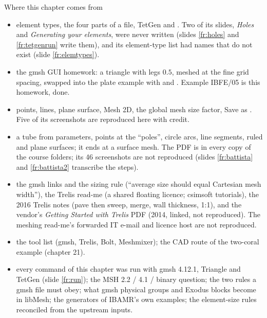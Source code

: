 \documentclass[aspectratio=169,11pt]{beamer}
\begin{document}
\begin{frame}{Where this chapter comes from}
\label{fr:sources}
\scriptsize
\begin{itemize}
  \item {} element types, the four parts of a  file, TetGen and . Two of its slides, \emph{Holes} and \emph{Generating your elements}, were never written (slides \ref{fr:holes} and \ref{fr:tetgenrun} write them), and its element-type list had names that do not exist (slide \ref{fr:elemtypes}).
  \item {} the gmsh GUI homework: a triangle with legs $0.5$, meshed at the fine grid spacing, swapped into the plate example with  and . Example IBFE/05 is this homework, done.
  \item {} points, lines, plane surface, Mesh 2D, the global mesh size factor, Save as . Five of its screenshots are reproduced here with credit.
  \item {} a tube from parameters, points at the ``poles'', circle arcs, line segments, ruled and plane surfaces; it ends at a surface mesh. The PDF is in every copy of the course folders; its 46 screenshots are not reproduced (slides \ref{fr:battista} and \ref{fr:battista2} transcribe the steps).
  \item {} the gmsh links and the sizing rule (``average size should equal Cartesian mesh width''), the Trelis read-me (a shared floating licence; csimsoft tutorials), the 2016 Trelis notes (pave then sweep, merge, wall thickness, 1:1), and the vendor's \emph{Getting Started with Trelis} PDF (2014, linked, not reproduced). The meshing read-me's forwarded IT e-mail and licence host are not reproduced.
  \item {} the tool list (gmsh, Trelis, Bolt, Meshmixer); the CAD route of the two-coral example (chapter 21).
  \item {} every command of this chapter was run with gmsh 4.12.1, Triangle and TetGen (slide \ref{fr:run}); the MSH 2.2 / 4.1 / binary question; the two rules a gmsh file must obey; what gmsh physical groups and Exodus blocks become in libMesh; the generators of IBAMR's own examples; the element-size rules reconciled from the upstream inputs.
\end{itemize}
\end{frame}
\end{document}
